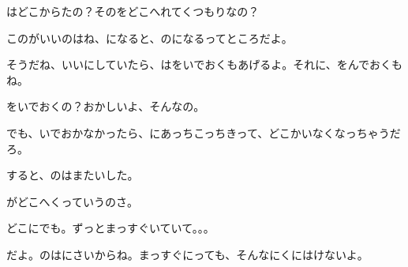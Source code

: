 はどこからたの？そのをどこへれてくつもりなの？

このがいいのはね、になると、のになるってところだよ。

そうだね、いいにしていたら、はをいでおくもあげるよ。それに、をんでおくもね。

をいでおくの？おかしいよ、そんなの。

でも、いでおかなかったら、にあっちこっちきって、どこかいなくなっちゃうだろ。

すると、のはまたいした。

がどこへくっていうのさ。

どこにでも。ずっとまっすぐいていて。。。

だよ。のはにさいからね。まっすぐにっても、そんなにくにはけないよ。


